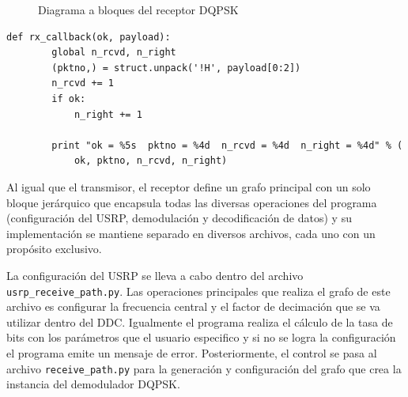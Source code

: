 \begin{figure}[htp]
  \centering
  \vspace{0.3in}
  \caption{Diagrama a bloques del receptor DQPSK}
  \label{fig:grdqpskrx}
\end{figure}

\begin{lstlisting}[float, label=ex:callback, caption={Funci\'on auxiliar que recibe los paquetes decodificados},
breaklines=true]
    def rx_callback(ok, payload):
        global n_rcvd, n_right
        (pktno,) = struct.unpack('!H', payload[0:2])
        n_rcvd += 1
        if ok:
            n_right += 1

        print "ok = %5s  pktno = %4d  n_rcvd = %4d  n_right = %4d" % (
            ok, pktno, n_rcvd, n_right)
\end{lstlisting}

Al igual que el transmisor, el receptor define un grafo principal con un solo bloque jer\'arquico que encapsula todas las
diversas operaciones del programa (configuraci\'on del USRP, demodulaci\'on y decodificaci\'on de datos) y su
implementaci\'on se mantiene separado en diversos archivos, cada uno con un prop\'osito exclusivo.

La configuraci\'on del USRP se lleva a cabo dentro del archivo \\ \verb|usrp_receive_path.py|. Las operaciones principales
que realiza el grafo de este archivo es configurar la frecuencia central y el factor de decimaci\'on que se va utilizar dentro
del DDC. Igualmente el programa realiza el c\'alculo de la tasa de bits con los par\'ametros que el usuario especifico y si
no se logra la configuraci\'on el programa emite un mensaje de error. Posteriormente, el control se pasa al archivo
\verb|receive_path.py| para la generaci\'on y configuraci\'on del grafo que crea la instancia del demodulador DQPSK.



